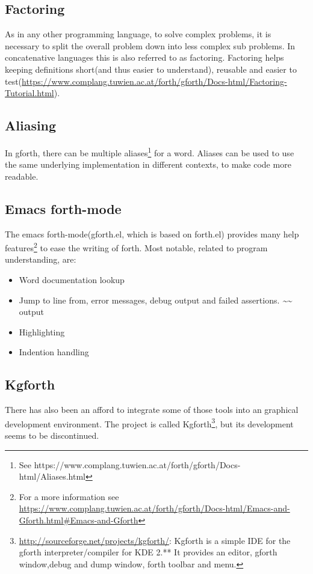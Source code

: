 \subsection*{Factoring}
As in any other programming language, to solve complex problems, it is necessary to split the overall problem down into less complex sub problems. In concatenative languages this is also referred to as factoring. Factoring helps keeping definitions short(and thus easier to understand), reusable and easier to test(\url{https://www.complang.tuwien.ac.at/forth/gforth/Docs-html/Factoring-Tutorial.html}).

\subsection*{Aliasing}
In gforth, there can be multiple aliases\footnote{See https://www.complang.tuwien.ac.at/forth/gforth/Docs-html/Aliases.html} for a word. Aliases can be used to use the same underlying implementation in different contexts, to make code more readable.

\subsection*{Emacs forth-mode}

The emacs forth-mode(gforth.el, which is based on forth.el) provides many help features\footnote{For a more information see \url{https://www.complang.tuwien.ac.at/forth/gforth/Docs-html/Emacs-and-Gforth.html\#Emacs-and-Gforth}} to ease the writing of forth. Most notable, related to program understanding, are:
\begin{itemize}
\item Word documentation lookup
\item Jump to line from, error messages, debug output and failed assertions. \emph{\textasciitilde\textasciitilde} output
\item Highlighting
\item Indention handling
\end{itemize}

\subsection*{Kgforth}

There has also been an afford to integrate some of those tools into an graphical development environment. The project is called Kgforth\footnote{\url{http://sourceforge.net/projects/kgforth/}: Kgforth is a simple IDE for the gforth interpreter/compiler for KDE 2.** 
It provides an editor, gforth window,debug and dump window, forth toolbar and menu.}, but its development seems to be discontinued.

